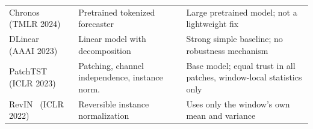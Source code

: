 \begin{table}[!t]
\begin{tabular}{@{}p{}p{}p{}@{}}
Chronos~\cite{chronos} (TMLR 2024) & Pretrained tokenized forecaster & Large pretrained model; not a lightweight fix \\
DLinear~\cite{dlinear} (AAAI 2023) & Linear model with decomposition & Strong simple baseline; no robustness mechanism \\
PatchTST~\cite{patchtst} (ICLR 2023) & Patching, channel independence, instance norm. & Base model; equal trust in all patches, window-local statistics only \\
RevIN~\cite{revin} (ICLR 2022) & Reversible instance normalization & Uses only the window's own mean and variance \\
\bottomrule
\end{tabular}
\end{table}
